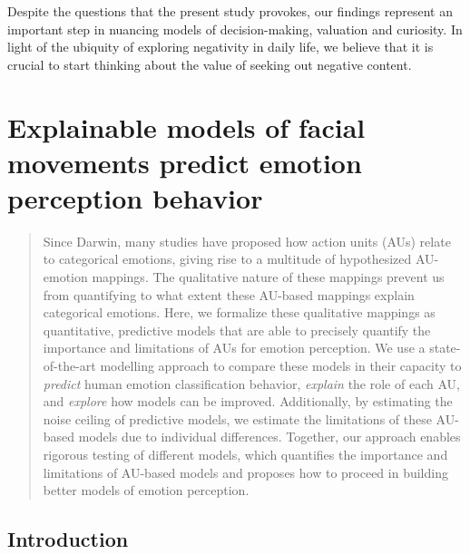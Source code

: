 \documentclass[11pt,american,a4paper,oneside,]{memoir} %
\begin{document}
Despite the questions that the present study provokes, our findings represent an important step in nuancing models of decision-making, valuation and curiosity. In light of the ubiquity of exploring negativity in daily life, we believe that it is crucial to start thinking about the value of seeking out negative content.

\hypertarget{hypothesis-kernel-analysis}{%
\chapter{Explainable models of facial movements predict emotion perception behavior}\label{hypothesis-kernel-analysis}}


\newpage
\normalsize

\begin{abstract}
Since Darwin, many studies have proposed how action units (AUs) relate to categorical emotions, giving rise to a multitude of hypothesized AU-emotion mappings. The qualitative nature of these mappings prevent us from quantifying to what extent these AU-based mappings explain categorical emotions. Here, we formalize these qualitative mappings as quantitative, predictive models that are able to precisely quantify the importance and limitations of AUs for emotion perception. We use a state-of-the-art modelling approach to compare these models in their capacity to \emph{predict} human emotion classification behavior, \emph{explain} the role of each AU, and \emph{explore} how models can be improved. Additionally, by estimating the noise ceiling of predictive models, we estimate the limitations of these AU-based models due to individual differences. Together, our approach enables rigorous testing of different models, which quantifies the importance and limitations of AU-based models and proposes how to proceed in building better models of emotion perception.
\end{abstract} \newpage

\hypertarget{hka-introduction}{%
\section{Introduction}\label{hka-introduction}}
\end{document}
